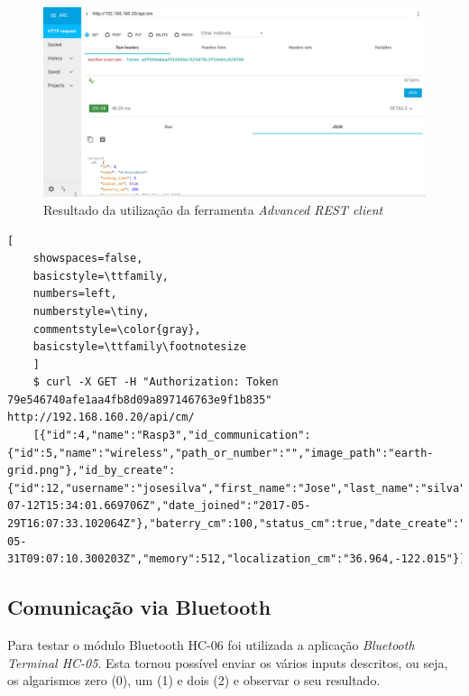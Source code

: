 \begin{figure}[h]
	\centering
	\includegraphics[width=0.7\linewidth]{prints-web/API_teste1.png}
	\caption{Resultado da utilização da ferramenta \textit{Advanced REST client}}
	\label{testgrap}
\end{figure}







	\begin{lstlisting}[
	showspaces=false,
	basicstyle=\ttfamily,
	numbers=left,
	numberstyle=\tiny,
	commentstyle=\color{gray},
	basicstyle=\ttfamily\footnotesize
	]
	$ curl -X GET -H "Authorization: Token  79e546740afe1aa4fb8d09a897146763e9f1b835" http://192.168.160.20/api/cm/
	[{"id":4,"name":"Rasp3","id_communication":{"id":5,"name":"wireless","path_or_number":"","image_path":"earth-grid.png"},"id_by_create":{"id":12,"username":"josesilva","first_name":"Jose","last_name":"silva","email":"ruipedrooliveira@ua.pt","last_login":"2017-07-12T15:34:01.669706Z","date_joined":"2017-05-29T16:07:33.102064Z"},"baterry_cm":100,"status_cm":true,"date_create":"2017-05-31T09:07:10.300203Z","memory":512,"localization_cm":"36.964,-122.015"}]
	\end{lstlisting}
	
	


\subsection{Comunicação via Bluetooth }


Para testar o módulo Bluetooth HC-06 foi utilizada a aplicação \textit{Bluetooth Terminal HC-05}. Esta tornou possível enviar os vários inputs descritos, ou seja,  os algarismos zero (0), um (1) e dois (2) e observar o seu resultado.  

